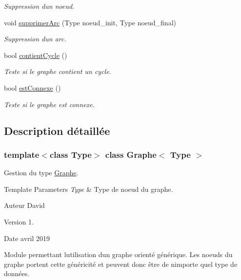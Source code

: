 \begin{DoxyCompactItemize}
\begin{DoxyCompactList}\small\item\em Suppression d\textquotesingle{}un noeud. \end{DoxyCompactList}\item 
void \hyperlink{classGraphe_a4d2b2b022f6c4747f15e1f4e059fef33}{supprimer\+Arc} (Type noeud\+\_\+init, Type noeud\+\_\+final)
\begin{DoxyCompactList}\small\item\em Suppression d\textquotesingle{}un arc. \end{DoxyCompactList}\item 
bool \hyperlink{classGraphe_aa003e00ed2d8c1d49c4b80e3dabfa4fd}{contient\+Cycle} ()
\begin{DoxyCompactList}\small\item\em Teste si le graphe contient un cycle. \end{DoxyCompactList}\item 
bool \hyperlink{classGraphe_a15609b3cd6e0ab6a96afb579ffd420c4}{est\+Connexe} ()
\begin{DoxyCompactList}\small\item\em Teste si le graphe est connexe. \end{DoxyCompactList}\end{DoxyCompactItemize}


\subsection{Description détaillée}
\subsubsection*{template$<$class Type$>$\newline
class Graphe$<$ Type $>$}

Gestion du type \hyperlink{classGraphe}{Graphe}. 


\begin{DoxyTemplParams}{Template Parameters}
{\em Type} & Type de noeud du graphe. \\
\hline
\end{DoxyTemplParams}
\begin{DoxyAuthor}{Auteur}
David 
\end{DoxyAuthor}
\begin{DoxyVersion}{Version}
1. 
\end{DoxyVersion}
\begin{DoxyDate}{Date}
avril 2019
\end{DoxyDate}
Module permettant l\textquotesingle{}utilisation d\textquotesingle{}un graphe orienté générique. Les noeuds du graphe portent cette généricité et peuvent donc être de n\textquotesingle{}importe quel type de données. 

